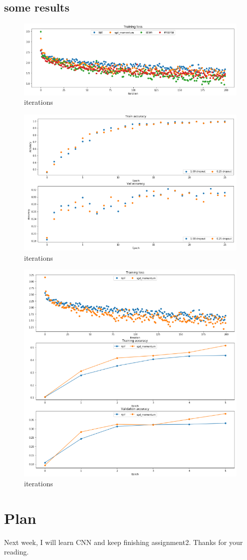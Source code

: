 \documentclass{article} %
\begin{document}
\subsection{some results}
\begin{figure}[htbp]
	\centering  %
	\includegraphics[width=1\textwidth]{4.png} 
	\caption{iterations}  %
	\label{fig:f4}   %
\end{figure}
\begin{figure}[htbp]
	\centering  %
	\includegraphics[width=1\textwidth]{5.png} 
	\caption{iterations}  %
	\label{fig:f5}   %
\end{figure}

\begin{figure}[htbp]
\centering  %
\includegraphics[width=.7\textwidth]{3.png} 
\caption{iterations}  %
\label{fig:f32}   %
\end{figure}
\section{Plan}
Next week, I will learn CNN and keep finishing assignment2. Thanks for your reading.
\end{document}
